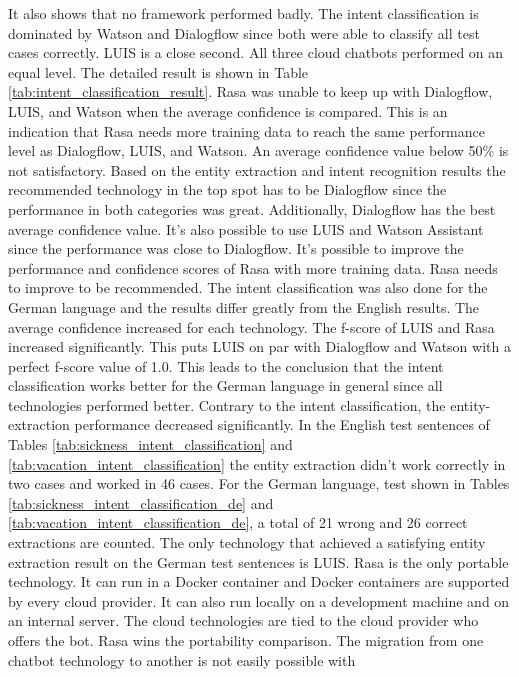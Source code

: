 It also shows that no framework performed badly.
The intent classification is dominated by Watson and Dialogflow since 
both were able to classify all test cases correctly.
LUIS is a close second.
All three cloud chatbots performed on an equal level.
The detailed result is shown in Table \ref{tab:intent_classification_result}.
Rasa was unable to keep up with Dialogflow, LUIS, and Watson when the 
average confidence is compared.
This is an indication that Rasa needs more training data to 
reach the same performance level as Dialogflow, LUIS, and Watson.
An average confidence value below 50\% is not satisfactory.
Based on the entity extraction and intent recognition results
the recommended technology in the top spot has to be Dialogflow
since the performance in both categories was great.
Additionally, Dialogflow has the best average confidence value.
It's also possible to use LUIS and Watson Assistant since the performance was close to Dialogflow.
It's possible to improve the performance and confidence scores of Rasa with more training data.
Rasa needs to improve to be recommended.
The intent classification was also done for the German language and the results differ greatly from the 
English results.
The average confidence increased for each technology.
The f-score of LUIS and Rasa increased significantly. 
This puts LUIS on par with Dialogflow and Watson with a perfect f-score value of 1.0.
This leads to the conclusion that the intent classification works better for the German 
language in general since all technologies performed better.
Contrary to the intent classification, the entity-extraction performance decreased significantly.
In the English test sentences of Tables \ref{tab:sickness_intent_classification} and \ref{tab:vacation_intent_classification}
the entity extraction didn't work correctly in two cases and worked in 46 cases.
For the German language, test shown in Tables \ref{tab:sickness_intent_classification_de} and \ref{tab:vacation_intent_classification_de},
a total of 21 wrong and 26 correct extractions are counted.
The only technology that achieved a satisfying entity extraction result on the German test sentences is LUIS.
Rasa is the only portable technology.
It can run in a Docker container and Docker containers are supported by every 
cloud provider.
It can also run locally on a development machine and on an internal server.
The cloud technologies are tied to the cloud provider who offers the bot.
Rasa wins the portability comparison.
The migration from one chatbot technology to another is not easily possible with 
